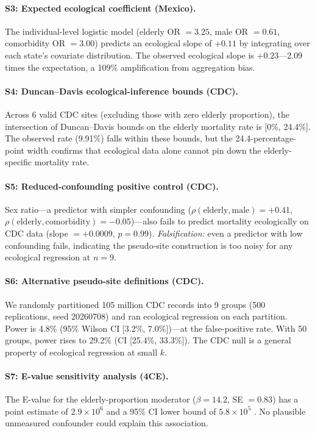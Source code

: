 \documentclass[11pt]{article}
\begin{document}
\paragraph{S3: Expected ecological coefficient (Mexico).}
The individual-level logistic model (elderly OR $= 3.25$, male
OR $= 0.61$, comorbidity OR $= 3.00$) predicts an ecological slope
of $+0.11$ by integrating over each state's covariate distribution.
The observed ecological slope is $+0.23$---2.09 times the expectation,
a 109\% amplification from aggregation bias.

\paragraph{S4: Duncan--Davis ecological-inference bounds (CDC).}
Across 6 valid CDC sites (excluding those with zero elderly proportion),
the intersection of Duncan--Davis bounds on the elderly mortality rate
is [0\%, 24.4\%].  The observed rate (9.91\%) falls within these bounds,
but the 24.4-percentage-point width confirms that ecological data alone
cannot pin down the elderly-specific mortality rate.

\paragraph{S5: Reduced-confounding positive control (CDC).}
Sex ratio---a predictor with simpler confounding
($\rho(\text{elderly}, \text{male}) = +0.41$,
$\rho(\text{elderly}, \text{comorbidity}) = -0.05$)---also fails
to predict mortality ecologically on CDC data (slope $= +0.0009$,
$p = 0.99$).  \emph{Falsification:} even a predictor with low
confounding fails, indicating the pseudo-site construction is too
noisy for any ecological regression at $n = 9$.

\paragraph{S6: Alternative pseudo-site definitions (CDC).}
We randomly partitioned 105 million CDC records into 9 groups
(500 replications, seed 20260708) and ran ecological regression
on each partition.  Power is 4.8\% (95\% Wilson CI [3.2\%, 7.0\%])---at
the false-positive rate.  With 50 groups, power rises to 29.2\%
(CI [25.4\%, 33.3\%]).  The CDC null is a general property of
ecological regression at small $k$.

\paragraph{S7: E-value sensitivity analysis (4CE).}
The E-value for the elderly-proportion moderator ($\beta = 14.2$,
SE $= 0.83$) has a point estimate of $2.9 \times 10^{6}$ and a
95\% CI lower bound of $5.8 \times 10^{5}$
\cite{vanderweele2017}.  No plausible unmeasured confounder could
explain this association.
\end{document}
